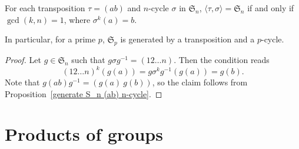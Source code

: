 \begin{corollary}\label{generate S_n trans n-cycle}
For each transposition $\tau=(ab)$ and $n$-cycle $\sigma$ in $\mathfrak{S}_n$, $\langle\tau,\sigma\rangle=\mathfrak{S}_n$ if and only if $\gcd(k,n)=1$, where $\sigma^k(a)=b$.\par
In particular, for a prime $p$, $\mathfrak{S}_p$ is generated by a transposition and a $p$-cycle.
\end{corollary}
\begin{proof}
Let $g\in\mathfrak{S}_n$ such that $g\sigma g^{-1}=(12\dots n)$. Then the condition reads
\[(12\dots n)^k(g(a))=g\sigma^kg^{-1}(g(a))=g(b).\]
Note that $g(ab)g^{-1}=(g(a)\ g(b))$, so the claim follows from Proposition~\ref{generate S_n (ab) n-cycle}.
\end{proof}
\section{Products of groups}
